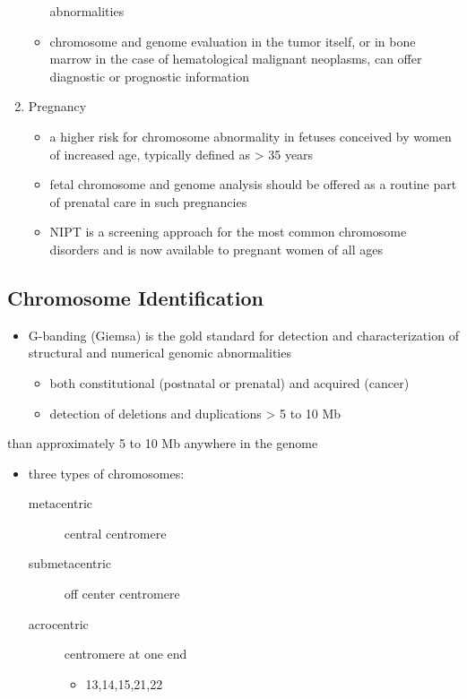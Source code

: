 \documentclass{scrartcl}
\begin{document}
\begin{enumerate}
\begin{itemize}
abnormalities
\item chromosome and genome evaluation in the tumor itself, or in bone
marrow in the case of hematological malignant neoplasms, can offer
diagnostic or prognostic information
\end{itemize}
\item Pregnancy
\label{sec:org2007659}
\begin{itemize}
\item a higher risk for chromosome abnormality in fetuses conceived by
women of increased age, typically defined as \textgreater{} 35 years
\item fetal chromosome and genome analysis should be offered as a routine
part of prenatal care in such pregnancies
\item NIPT is a screening approach for the most common chromosome
disorders and is now available to pregnant women of all ages
\end{itemize}
\end{enumerate}

\subsection{Chromosome Identification}
\label{sec:orgdb3d6da}
\begin{itemize}
\item G-banding (Giemsa) is the gold standard for detection and
characterization of structural and numerical genomic abnormalities
\begin{itemize}
\item both constitutional (postnatal or prenatal) and acquired (cancer)
\item detection of deletions and duplications \textgreater{} 5 to 10 Mb
\end{itemize}
\end{itemize}
than approximately 5 to 10 Mb anywhere in the genome
\begin{itemize}
\item three types of chromosomes:
\begin{description}
\item[{metacentric}] central centromere
\item[{submetacentric}] off center centromere
\item[{acrocentric}] centromere at one end
\begin{itemize}
\item 13,14,15,21,22
\end{itemize}
\end{description}
\end{itemize}
\end{document}

